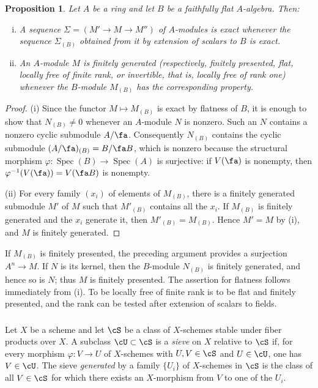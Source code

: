 \documentclass[12pt,oneside,english]{smfbook}
\DeclareMathOperator{\spec}{Spec}
\newtheorem{proposition}[subsubsection]{Proposition}
\begin{document}
\begin{proposition}\label{I:1-4-2}
Let $A$ be a ring and let $B$ be a faithfully flat $A$-algebra. Then:
\begin{enumerate}[(i)]
  \item A sequence $\Sigma=(M'\to M\to M'')$ of $A$-modules is exact whenever the sequence $\Sigma_{(B)}$ obtained from it by extension of scalars to $B$ is exact.
  \item An $A$-module $M$ is finitely generated (respectively, finitely presented, flat, locally free of finite rank, or invertible, that is, locally free of rank one) whenever the $B$-module $M_{(B)}$ has the corresponding property.
\end{enumerate}
\end{proposition}
\begin{proof}
(i) Since the functor $M\mapsto M_{(B)}$ is exact by flatness of $B$, it is enough to show that $N_{(B)}\ne0$ whenever an $A$-module $N$ is nonzero. Such an $N$ contains a nonzero cyclic submodule $A/\fa$. Consequently $N_{(B)}$ contains the cyclic submodule $(A/\fa)_{(B)}=B/\fa B$, which is nonzero because the structural morphism $\varphi:\spec(B)\to\spec(A)$ is surjective: if $V(\fa)$ is nonempty, then $\varphi^{-1}(V(\fa))=V(\fa B)$ is nonempty.

(ii) For every family $(x_i)$ of elements of $M_{(B)}$, there is a finitely generated submodule $M'$ of $M$ such that $M'_{(B)}$ contains all the $x_i$. If $M_{(B)}$ is finitely generated and the $x_i$ generate it, then $M'_{(B)}=M_{(B)}$. Hence $M'=M$ by (i), and $M$ is finitely generated.
\end{proof}

If $M_{(B)}$ is finitely presented, the preceding argument provides a surjection $A^n\to M$. If $N$ is its kernel, then the $B$-module $N_{(B)}$ is finitely generated, and hence so is $N$; thus $M$ is finitely presented. The assertion for flatness follows immediately from (i). To be locally free of finite rank is to be flat and finitely presented, and the rank can be tested after extension of scalars to fields.

\subsubsection{}\label{I:1-4-3}

Let $X$ be a scheme and let $\cS$ be a class of $X$-schemes stable under fiber products over $X$. A subclass $\cU\subset\cS$ is a \emph{sieve} on $X$ relative to $\cS$ if, for every morphism $\varphi:V\to U$ of $X$-schemes with $U,V\in\cS$ and $U\in\cU$, one has $V\in\cU$. The sieve \emph{generated} by a family $\{U_i\}$ of $X$-schemes in $\cS$ is the class of all $V\in\cS$ for which there exists an $X$-morphism from $V$ to one of the $U_i$.
\end{document}
